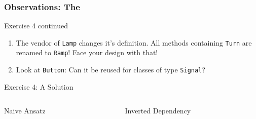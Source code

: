 \documentclass[9pt]{beamer}
\begin{document}
\begin{frame}
  \frametitle{Observations: The \secname}
\begin{exampleblock}{Exercise 4 continued}
  \begin{enumerate}
  \item The vendor of \texttt{Lamp} changes it's definition. All methods containing \texttt{Turn} are renamed to \texttt{Ramp}! Face your design with that!
    \pause
  \item Look at \texttt{Button}: Can it be reused for classes of type \texttt{Signal}?
  \end{enumerate}
\end{exampleblock}
\pause
\begin{exampleblock}{Exercise 4: A Solution}
  \begin{columns}[t]

    \begin{column}{.45\textwidth}
       \begin{block}{Naive Ansatz}

          \begin{center}
          \end{center}
       \end{block}
    \end{column}

    \begin{column}{.45\textwidth}
       \begin{block}{Inverted Dependency}
       \begin{center}
       \end{center}
      \end{block}
    \end{column}


\end{columns}
\end{exampleblock}
\end{frame}
\end{document}
